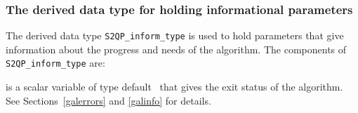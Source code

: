 \documentclass{galahad}
\newcommand{\packagename}{S2QP}
\begin{document}
\begin{description}
\end{description}


\subsubsection{The derived data type for holding informational
 parameters}\label{typeinform}
The derived data type
{\tt \packagename\_inform\_type}
is used to hold parameters that give information about the progress and needs
of the algorithm. The components of
{\tt \packagename\_inform\_type}
are:

\begin{description}
 is a scalar variable of type default \integer\ that gives the
exit status of the algorithm. See Sections~\ref{galerrors} and \ref{galinfo}
for details.
\end{description}

\end{document}
